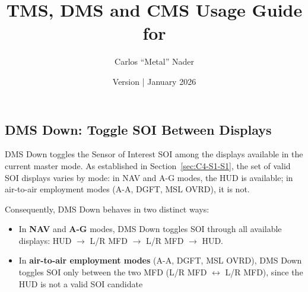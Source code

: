 \documentclass[11pt,a4paper]{article}
\title{TMS, DMS and CMS Usage Guide for \bmsver}
\author{Carlos ``Metal'' Nader}
\date{Version \fulldocversion{} | January 2026}
\begin{document}
\maketitle

\newpage

\tableofcontents

\newpage




\subsection{DMS Down: Toggle SOI Between Displays}
\label{sec:C4-S3}


DMS Down toggles the Sensor of Interest SOI among the displays available in the current master mode. As established in Section~\ref{sec:C4-S1-S1}, the set of valid SOI displays varies by mode: in NAV and A-G modes, the HUD is available; in air-to-air employment modes (A-A, DGFT, MSL OVRD), it is not.

Consequently, DMS Down behaves in two distinct ways:

\begin{itemize}
  \item In \textbf{NAV} and \textbf{A-G} modes, DMS Down toggles SOI through all available displays: HUD $\rightarrow$ L/R MFD $\rightarrow$ L/R MFD $\rightarrow$ HUD.
  \item In \textbf{air-to-air employment modes} (A-A, DGFT, MSL OVRD), DMS Down toggles SOI only between the two MFD (L/R MFD $\leftrightarrow$ L/R MFD), since the HUD is not a valid SOI candidate
\end{itemize}
\end{document}
